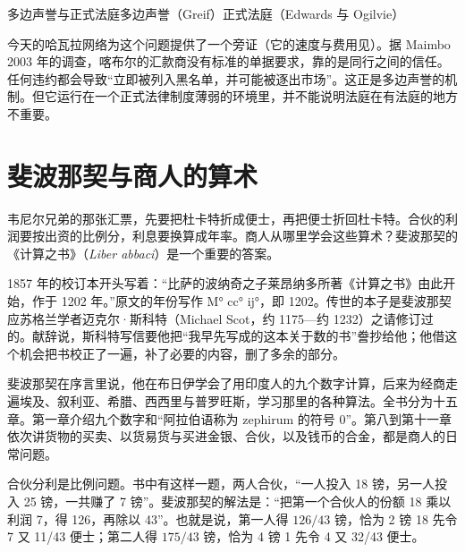 \begin{compare}{多边声誉与正式法庭}{多边声誉（Greif）}{正式法庭（Edwards 与 Ogilvie）}
\end{compare}

今天的哈瓦拉网络为这个问题提供了一个旁证（它的速度与费用见）。据 Maimbo 2003 年的调查，喀布尔的汇款商没有标准的单据要求，靠的是同行之间的信任。任何违约都会导致“立即被列入黑名单，并可能被逐出市场”\cite{maimbo2003}。这正是多边声誉的机制。但它运行在一个正式法律制度薄弱的环境里，并不能说明法庭在有法庭的地方不重要。

\section{斐波那契与商人的算术}\label{sec:islamic-abacus}

韦尼尔兄弟的那张汇票，先要把杜卡特折成便士，再把便士折回杜卡特。合伙的利润要按出资的比例分，利息要换算成年率。商人从哪里学会这些算术？斐波那契的《计算之书》（\emph{Liber abbaci}）是一个重要的答案。

1857 年的校订本开头写着：“比萨的波纳奇之子莱昂纳多所著《计算之书》由此开始，作于 1202 年。”\cite{fibonacci1857}原文的年份写作 M° cc° ij°，即 1202。传世的本子是斐波那契应苏格兰学者迈克尔·斯科特（Michael Scot，约 1175—约 1232）之请修订过的。献辞说，斯科特写信要他把“我早先写成的这本关于数的书”誊抄给他；他借这个机会把书校正了一遍，补了必要的内容，删了多余的部分。

斐波那契在序言里说，他在布日伊学会了用印度人的九个数字计算，后来为经商走遍埃及、叙利亚、希腊、西西里与普罗旺斯，学习那里的各种算法。全书分为十五章。第一章介绍九个数字和“阿拉伯语称为 zephirum 的符号 0”。第八到第十一章依次讲货物的买卖、以货易货与买进金银、合伙，以及钱币的合金\cite{fibonacci1857}，都是商人的日常问题。

合伙分利是比例问题。书中有这样一题，两人合伙，“一人投入 18 镑，另一人投入 25 镑，一共赚了 7 镑”。斐波那契的解法是：“把第一个合伙人的份额 18 乘以利润 7，得 126，再除以 43”\cite{fibonacci1857}。也就是说，第一人得 $126/43$ 镑，恰为 2 镑 18 先令 7 又 11/43 便士；第二人得 $175/43$ 镑，恰为 4 镑 1 先令 4 又 32/43 便士。

